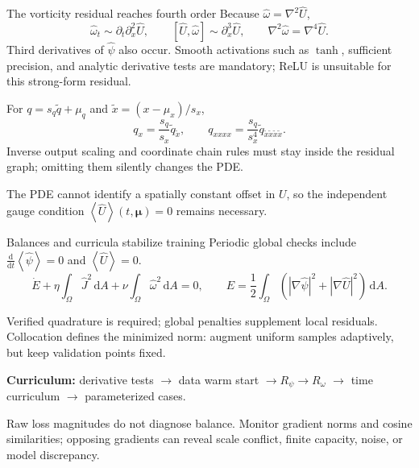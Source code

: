 \documentclass[aspectratio=169,11pt]{beamer}
\newcommand{\bracket}[2]{\left[#1,#2\right]}
\newcommand{\dd}{\,\mathrm{d}}
\newcommand{\average}[1]{\left\langle #1\right\rangle}
\newcommand{\Rpsi}{R_{\psi}}
\newcommand{\Romega}{R_{\omega}}
\newcommand{\vect}[1]{\bm{#1}}
\newcommand{\currentmodule}{Module 1}
\newcommand{\moduleprogress}{1 of 6}
\newcommand{\setmodule}[2]{%
  \renewcommand{\currentmodule}{#1}%
  \renewcommand{\moduleprogress}{#2}%
}
\begin{document}
\setmodule{Module 5}{3 of 5}
\begin{frame}{The vorticity residual reaches fourth order}
Because $\widehat\omega=\nabla^2\widehat U$,
\[
\widehat\omega_t\sim\partial_t\partial_x^2\widehat U,
\qquad
\bracket{\widehat U}{\widehat\omega}\sim\partial_x^3\widehat U,
\qquad
\nabla^2\widehat\omega=\nabla^4\widehat U.
\]
Third derivatives of $\widehat\psi$ also occur.  Smooth activations such as $\tanh$, sufficient precision, and analytic derivative tests are mandatory; ReLU is unsuitable for this strong-form residual.

For $q=s_q\widetilde q+\mu_q$ and $\widetilde x=(x-\mu_x)/s_x$,
\[
q_x=\frac{s_q}{s_x}\widetilde q_{\widetilde x},
\qquad
q_{xxxx}=\frac{s_q}{s_x^4}\widetilde q_{\widetilde x\widetilde x\widetilde x\widetilde x}.
\]
Inverse output scaling and coordinate chain rules must stay inside the residual graph; omitting them silently changes the PDE.

The PDE cannot identify a spatially constant offset in $U$, so the independent gauge condition $\boxed{\average{\widehat U}(t,\vect\mu)=0}$ remains necessary.
\end{frame}

\setmodule{Module 5}{4 of 5}
\begin{frame}{Balances and curricula stabilize training}
Periodic global checks include $\frac{\mathrm d}{\mathrm dt}\average{\widehat\psi}=0$ and $\average{\widehat U}=0$.
\[
\boxed{
\dot E
+\eta\int_{\Omega}\widehat J^2\dd A
+\nu\int_{\Omega}\widehat\omega^2\dd A=0,
\qquad
E=\frac12\int_\Omega\left(|\nabla\widehat\psi|^2+|\nabla\widehat U|^2\right)\dd A.}
\]

Verified quadrature is required; global penalties supplement local residuals. Collocation defines the minimized norm: augment uniform samples adaptively, but keep validation points fixed.

\textbf{Curriculum:} derivative tests $\rightarrow$ data warm start $\rightarrow\Rpsi\rightarrow\Romega$
$\rightarrow$ time curriculum $\rightarrow$ parameterized cases.

Raw loss magnitudes do not diagnose balance. Monitor gradient norms and cosine similarities; opposing gradients can reveal scale conflict, finite capacity, noise, or model discrepancy.
\end{frame}
\end{document}
